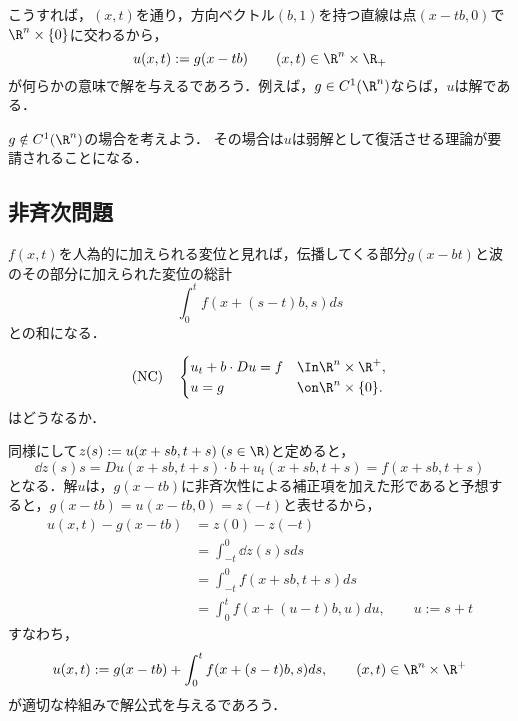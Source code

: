 \documentclass[uplatex,dvipdfmx]{jsreport}
\begin{document}
\begin{observation}\label{observation-homogeneous-transport-eq}
    こうすれば，$(x,t)$を通り，方向ベクトル$(b,1)$を持つ直線は点$(x-tb,0)$で$\R^n\times\{0\}$に交わるから，
    \[u(x,t):=g(x-tb)\qquad(x,t)\in\R^n\times\R_+\]
    が何らかの意味で解を与えるであろう．例えば，$g\in C^1(\R^n)$ならば，$u$は解である．
\end{observation}
\begin{remarks}
    $g\notin C^1(\R^n)$の場合を考えよう．
    その場合は$u$は弱解として復活させる理論が要請されることになる．
\end{remarks}

\subsection{非斉次問題}

\begin{tcolorbox}[colframe=ForestGreen, colback=ForestGreen!10!white,breakable,colbacktitle=ForestGreen!40!white,coltitle=black,fonttitle=\bfseries\sffamily,
title=]
    $f(x,t)$を人為的に加えられる変位と見れば，伝播してくる部分$g(x-bt)$と波のその部分に加えられた変位の総計
    \[\int^t_0f(x+(s-t)b,s)ds\]
    との和になる．
\end{tcolorbox}

\begin{problem}
    \[\text{(NC)}\quad\begin{cases}
        u_t+b\cdot Du=f&\In \R^n\times\R^+,\\
        u=g&\on\R^n\times\{0\}.
    \end{cases}\]
    はどうなるか．
\end{problem}

\begin{observation}\label{observation-nonhomogeneous-transport-eq}
    同様にして$z(s):=u(x+sb,t+s)\;(s\in\R)$と定めると，
    \[\dd{z(s)}{s}=Du(x+sb,t+s)\cdot b+u_t(x+sb,t+s)=f(x+sb,t+s)\]
    となる．解$u$は，$g(x-tb)$に非斉次性による補正項を加えた形であると予想すると，$g(x-tb)=u(x-tb,0)=z(-t)$と表せるから，
    \begin{align*}
        u(x,t)-g(x-tb)&=z(0)-z(-t)\\
        &=\int^0_{-t}\dd{z(s)}{s}ds\\
        &=\int^0_{-t}f(x+sb,t+s)ds\\
        &=\int^t_0f(x+(u-t)b,u)du,\qquad u:=s+t
    \end{align*}
    すなわち，
    \[u(x,t):=g(x-tb)+\int^t_0f(x+(s-t)b,s)ds,\qquad (x,t)\in\R^n\times\R^+\]
    が適切な枠組みで解公式を与えるであろう．
\end{observation}
\end{document}
